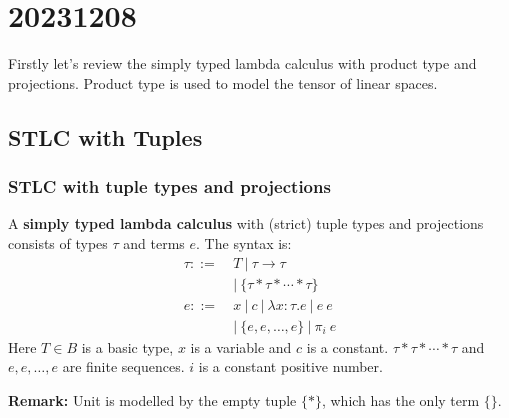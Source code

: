 
\chapter{20231208}

Firstly let's review the simply typed lambda calculus with product type and projections. Product type is used to model the tensor of linear spaces.

\section{STLC with Tuples}

\subsection{STLC with tuple types and projections}

\begin{definition}
    A \textbf{simply typed lambda calculus} with (strict) tuple types and projections consists of types $\tau$ and terms $e$. The syntax is:
    \begin{align*}
        \tau ::=&\ T\ |\ \tau \to \tau\\
          &\ |\ \{ \tau * \tau * \cdots * \tau \} \\
        e ::=&\ x\ |\ c\ |\ \lambda x : \tau. e\ |\ e\ e\\
          &\ |\ \{ e, e, \dots, e \}\ |\ \pi_i\ e
    \end{align*}
    Here $T \in B$ is a basic type, $x$ is a variable and $c$ is a constant.
    $\tau * \tau * \cdots * \tau$ and $e, e, \dots, e$ are finite sequences. $i$ is a constant positive number.
\end{definition}

\textbf{Remark:} Unit is modelled by the empty tuple $\{*\}$, which has the only term $\{\}$.

